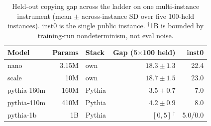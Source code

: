\begin{table}[t]\centering
\begin{tabular}{lrlrr}
\toprule
Model & Params & Stack & Gap (5$\times$100 held) & inst0 \\
\midrule
nano        & 3.15M & own    & $18.3 \pm 1.3$ & 22.4 \\
scale       & 10M   & own    & $18.7 \pm 1.5$ & 23.0 \\
pythia-160m & 160M  & Pythia & $3.5 \pm 0.7$  & 7.0 \\
pythia-410m & 410M  & Pythia & $4.2 \pm 0.9$  & 8.0 \\
pythia-1b   & 1B    & Pythia & $[0, 5]$\,$^\dagger$ & 5.0/0.0 \\
\bottomrule
\end{tabular}
\caption{Held-out copying gap across the ladder on one multi-instance instrument
(mean $\pm$ across-instance SD over five 100-held instances). inst0 is the single
public instance. $^\dagger$1B is bounded by training-run nondeterminism, not eval noise.}
\label{tab:gap-ladder}
\end{table}
